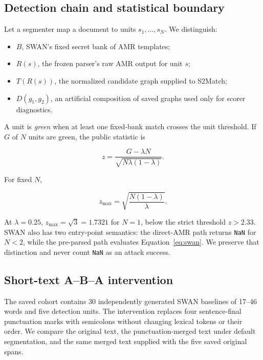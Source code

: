\documentclass[10pt]{article}
\begin{document}
\subsection{Detection chain and statistical boundary}

Let a segmenter map a document to units $s_1,\ldots,s_N$. We distinguish:

\begin{itemize}
  \item $B$, SWAN's fixed secret bank of AMR templates;
  \item $R(s)$, the frozen parser's raw AMR output for unit $s$;
  \item $T(R(s))$, the normalized candidate graph supplied to S2Match;
  \item $D(g_1,g_2)$, an artificial composition of saved graphs used only for
  scorer diagnostics.
\end{itemize}

A unit is \emph{green} when at least one fixed-bank match crosses the unit
threshold. If $G$ of $N$ units are green, the public statistic is

\begin{equation}
z = \frac{G-\lambda N}{\sqrt{N\lambda(1-\lambda)}}.
\label{eq:swan}
\end{equation}

For fixed $N$,

\begin{equation}
z_{\max} = \sqrt{\frac{N(1-\lambda)}{\lambda}}.
\end{equation}

At $\lambda=0.25$, $z_{\max}=\sqrt{3}=1.7321$ for $N=1$, below the
strict threshold $z>2.33$. SWAN also has two entry-point semantics: the
direct-AMR path returns \texttt{NaN} for $N<2$, while the pre-parsed path
evaluates Equation~\ref{eq:swan}. We preserve that distinction and never
count \texttt{NaN} as an attack success.

\subsection{Short-text A--B--A intervention}

The saved cohort contains 30 independently generated SWAN baselines of
17--46 words and five detection units. The intervention replaces four
sentence-final punctuation marks with semicolons without changing lexical
tokens or their order. We compare the original text, the punctuation-merged
text under default segmentation, and the same merged text supplied with the
five saved original spans.
\end{document}
